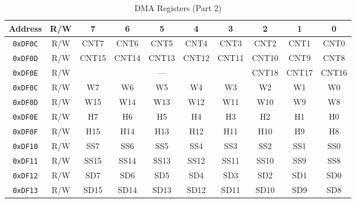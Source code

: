 \begin{table}[ht]
    \begin{center}
        \begin{tabular}{|c|c|c|c|c|c|c|c|c|c|} \hline
            Address & R/W & 7 & 6 & 5 & 4 & 3 & 2 & 1 & 0 \\\hline\hline
            \verb+0xDF0C+ & R/W & CNT7 & CNT6 & CNT5 & CNT4 & CNT3 & CNT2 & CNT1 & CNT0 \\ \hline
            \verb+0xDF0D+ & R/W & CNT15 & CNT14 & CNT13 & CNT12 & CNT11 & CNT10 & CNT9 & CNT8 \\ \hline
            \verb+0xDF0E+ & R/W & \multicolumn{5}{|c|}{---} & CNT18 & CNT17 & CNT16 \\ \hline\hline

            \verb+0xDF0C+ & R/W & W7 & W6 & W5 & W4 & W3 & W2 & W1 & W0 \\ \hline
            \verb+0xDF0D+ & R/W & W15 & W14 & W13 & W12 & W11 & W10 & W9 & W8 \\ \hline
            \verb+0xDF0E+ & R/W & H7 & H6 & H5 & H4 & H3 & H2 & H1 & H0 \\ \hline
            \verb+0xDF0F+ & R/W & H15 & H14 & H13 & H12 & H11 & H10 & H9 & H8 \\ \hline\hline

            \verb+0xDF10+ & R/W & SS7 & SS6 & SS5 & SS4 & SS3 & SS2 & SS1 & SS0 \\ \hline
            \verb+0xDF11+ & R/W & SS15 & SS14 & SS13 & SS12 & SS11 & SS10 & SS9 & SS8 \\ \hline

            \verb+0xDF12+ & R/W & SD7 & SD6 & SD5 & SD4 & SD3 & SD2 & SD1 & SD0 \\ \hline
            \verb+0xDF13+ & R/W & SD15 & SD14 & SD13 & SD12 & SD11 & SD10 & SD9 & SD8 \\ \hline
        \end{tabular}
    \end{center}
    \caption{DMA Registers (Part 2)}
    \label{tab:dma_reg_2}
\end{table}



